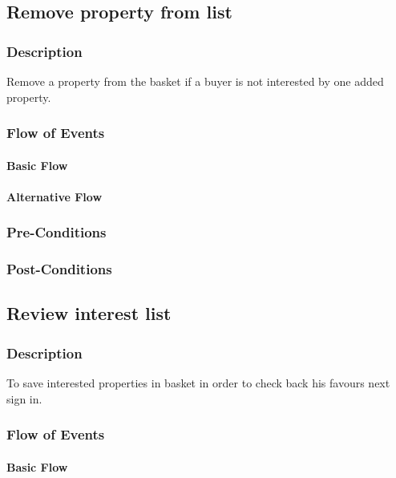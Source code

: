 \documentclass[a4paper,12pt]{article}
\begin{document}
\subsection{Remove property from list}
\subsubsection{Description}
Remove a property from the basket if a buyer is not interested by one added property.
\subsubsection{Flow of Events}
\paragraph{Basic Flow}
\begin{itemize}
\end{itemize}
\paragraph{Alternative Flow}
\begin{itemize}
\end{itemize}
\subsubsection{Pre-Conditions}
\subsubsection{Post-Conditions}

\subsection{Review interest list}
\subsubsection{Description}
To save interested properties in basket in order to check back his favours next sign in.
\subsubsection{Flow of Events}
\paragraph{Basic Flow}
\begin{itemize}
\end{itemize}
\end{document}
